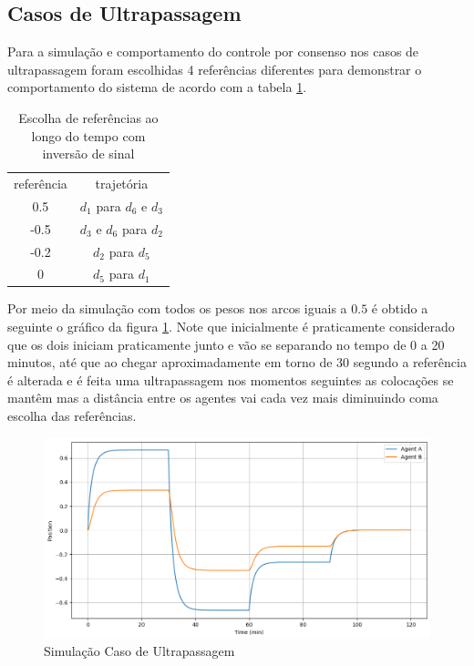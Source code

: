 \subsection{Casos de Ultrapassagem}
Para a simulação e comportamento do controle por consenso nos casos de ultrapassagem foram escolhidas 4 referências diferentes para demonstrar o comportamento do sistema de acordo com a tabela \ref{tab:caso1_utrapassagem}. 
\begin{table}[ht]
    \centering
    \begin{tabular}{c|c}                 
         referência & trajetória  \\ \cline{1-2}
          0.5 & $d_1$ para $d_6$ e $d_3$  \\ \cline{1-2}
         -0.5 & $d_3$ e $d_6$ para $d_2$ \\ \cline{1-2}
         -0.2 & $d_2$ para $d_5$  \\ \cline{1-2}
            0 & $d_5$ para $d_1$ \\     
    \end{tabular}
    \caption{Escolha de referências ao longo do tempo com inversão de sinal}
    \label{tab:caso1_utrapassagem}
\end{table}
Por meio da simulação com todos os pesos nos arcos iguais a $0.5$ é obtido a seguinte o gráfico da figura \ref{fig:case1}. Note que inicialmente é praticamente  considerado que os dois iniciam praticamente junto e vão se separando no tempo de 0 a 20 minutos, até que ao chegar aproximadamente em torno de 30 segundo a referência é alterada e é feita uma ultrapassagem nos momentos seguintes as colocações se mantêm mas a distância entre os agentes vai cada vez mais diminuindo coma escolha das referências. 

\begin{figure}[ht]
    \centering
    \caption{Simulação Caso de Ultrapassagem}
    \label{fig:case1}
    \includegraphics[width=1\linewidth]{figures/Simulation/Cooperativo/case1.png}
\end{figure}

